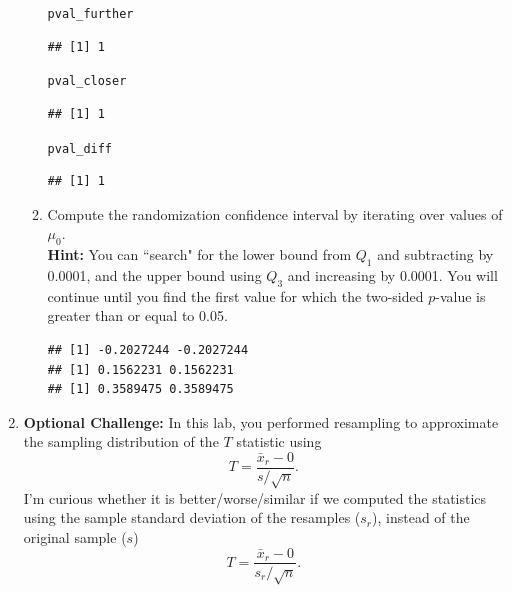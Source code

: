 \documentclass{article}\usepackage[]{graphicx}\usepackage[]{xcolor}
\makeatletter
\newcommand{\hldef}[1]{\textcolor[rgb]{0.345,0.345,0.345}{#1}}%
\newenvironment{kframe}{%
 \def\at@end@of@kframe{}%
 \ifinner\ifhmode%
  \def\at@end@of@kframe{\end{minipage}}%
  \begin{minipage}{\columnwidth}%
 \fi\fi%
 \def\FrameCommand##1{\hskip\@totalleftmargin \hskip-\fboxsep
 \colorbox{shadecolor}{##1}\hskip-\fboxsep
     \hskip-\linewidth \hskip-\@totalleftmargin \hskip\columnwidth}%
 \MakeFramed {\advance\hsize-\width
   \@totalleftmargin\z@ \linewidth\hsize
   \@setminipage}}%
 {\par\unskip\endMakeFramed%
 \at@end@of@kframe}
\newenvironment{knitrout}{}{} %
\makeatother
\begin{document}
\begin{enumerate}
\begin{enumerate}
\begin{knitrout}
\begin{kframe}
\begin{alltt}
\hldef{pval_further}
\end{alltt}
\begin{verbatim}
## [1] 1
\end{verbatim}
\begin{alltt}
\hldef{pval_closer}
\end{alltt}
\begin{verbatim}
## [1] 1
\end{verbatim}
\begin{alltt}
\hldef{pval_diff}
\end{alltt}
\begin{verbatim}
## [1] 1
\end{verbatim}
\end{kframe}
\end{knitrout}
  
  \item Compute the randomization confidence interval by iterating over values of $\mu_0$.\\
  \textbf{Hint:} You can ``search" for the lower bound from $Q_1$ and subtracting by 0.0001, 
  and the upper bound using $Q_3$ and increasing by 0.0001. You will continue until you find 
  the first value for which the two-sided $p$-value is greater than or equal to 0.05.
\begin{knitrout}
\color{fgcolor}\begin{kframe}
\begin{verbatim}
## [1] -0.2027244 -0.2027244
## [1] 0.1562231 0.1562231
## [1] 0.3589475 0.3589475
\end{verbatim}
\end{kframe}
\end{knitrout}
\end{enumerate}
\item \textbf{Optional Challenge:} In this lab, you performed resampling to 
approximate the sampling distribution of the $T$ statistic using
\[T = \frac{\bar{x}_r - 0}{s/\sqrt{n}}.\]
I'm curious whether it is better/worse/similar if we computed the statistics
using the sample standard deviation of the resamples ($s_r$), instead of the 
original sample ($s$)
  \[T = \frac{\bar{x}_r - 0}{s_r/\sqrt{n}}.\]

\end{enumerate}
\end{document}
